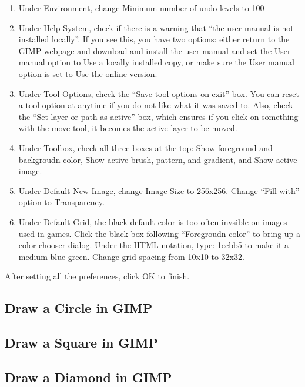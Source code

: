 \documentclass[12pt]{amsbook}
\theoremstyle{definition}
\theoremstyle{remark}
\numberwithin{figure}{chapter}
\numberwithin{table}{chapter}
\numberwithin{section}{chapter}
\numberwithin{equation}{section}
\begin{document}
\begin{enumerate}
\item Under Environment, change Minimum number of undo levels to 100
\item Under Help System, check if there is a warning that ``the user manual is not installed locally''.  If you see this, you have two options: either return to the GIMP webpage and download and install the user manual and set the User manual option to Use a locally installed copy, or make sure the User manual option is set to Use the online version.

\item Under Tool Options, check the ``Save tool options on exit'' box.  You can reset a tool option at anytime if you do not like what it was saved to.  Also, check the ``Set layer or path as active'' box, which ensures if you click on something with the move tool, it becomes the active layer to be moved.

\item Under Toolbox, check all three boxes at the top: Show foreground and backgroudn color, Show active brush, pattern, and gradient, and Show active image.

\item Under Default New Image, change Image Size to 256x256.  Change ``Fill with'' option to Transparency.

\item Under Default Grid, the black default color is too often invsible on images used in games.  Click the black box following ``Foregroudn color'' to bring up a color chooser dialog.  Under the HTML notation, type: 1ecbb5 to make it a medium blue-green.  Change grid spacing from 10x10 to 32x32.
\end{enumerate}

After setting all the preferences, click OK to finish.

\subsection{Draw a Circle in GIMP}


\subsection{Draw a Square in GIMP}

\subsection{Draw a Diamond in GIMP}
\end{document}
